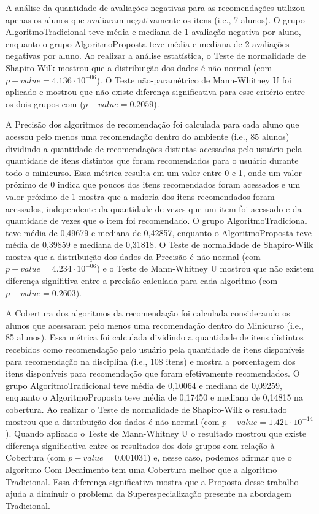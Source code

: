 A análise da quantidade de avaliações negativas para as recomendações utilizou apenas os alunos que avaliaram negativamente
os itens (i.e., 7 alunos). O grupo AlgoritmoTradicional teve média e mediana de 1 avaliação negativa
por aluno, enquanto o grupo AlgoritmoProposta teve média e mediana de 2 avaliações negativas por aluno.
Ao realizar a análise estatística, o Teste de normalidade de Shapiro-Wilk mostrou que a distribuição dos dados é não-normal
(com $p-value = 4.136 \cdot 10^{-06}$). O Teste não-paramétrico de Mann-Whitney U foi aplicado e mostrou que não existe
diferença significativa para esse critério entre os dois grupos com ($p-value = 0.2059$).

A Precisão dos algoritmos de recomendação foi calculada para cada aluno que acessou pelo menos uma recomendação dentro do
ambiente (i.e., 85 alunos) dividindo a quantidade de recomendações distintas acessadas pelo usuário pela quantidade de
itens distintos que foram recomendados para o usuário durante todo o minicurso. Essa métrica resulta em um valor entre
0 e 1, onde um valor próximo de 0 indica que poucos dos itens recomendados foram acessados e um valor próximo de 1
mostra que a maioria dos itens recomendados foram acessados, independente da quantidade de vezes que um item foi
acessado e da quantidade de vezes que o item foi recomendado. O grupo AlgoritmoTradicional teve média de
0,49679 e mediana de 0,42857, enquanto o AlgoritmoProposta teve média de 0,39859 e mediana de 0,31818.
O Teste de normalidade de Shapiro-Wilk mostra que a distribuição dos
dados da Precisão é não-normal (com $p-value = 4.234 \cdot 10^{-06}$) e o Teste de Mann-Whitney U mostrou que não existem diferença signifitiva entre a
precisão calculada para cada algoritmo (com $p-value = 0.2603$).

A Cobertura dos algoritmos da recomendação foi calculada considerando os alunos que acessaram pelo menos uma recomendação
dentro do Minicurso (i.e., 85 alunos). Essa métrica foi calculada dividindo a quantidade de itens distintos recebidos
como recomendação pelo usuário pela quantidade de itens disponíveis para recomendação na disciplina (i.e., 108 itens) e mostra
a porcentagem dos itens disponíveis para recomendação que foram efetivamente recomendados. O grupo AlgoritmoTradicional
teve média de 0,10064 e mediana de 0,09259, enquanto o AlgoritmoProposta teve média de 0,17450 e mediana de 0,14815 na cobertura.
Ao realizar o Teste de normalidade de Shapiro-Wilk o resultado mostrou que a distribuição dos dados é não-normal (com $p-value = 1.421 \cdot 10^{-14}$).
Quando aplicado o Teste de Mann-Whitney U o resultado mostrou que existe diferença significativa entre os resultados dos dois grupos com relação à Cobertura
(com $p-value = 0.001031$) e, nesse caso, podemos afirmar que o algoritmo Com Decaimento tem uma Cobertura melhor que a
algoritmo Tradicional. Essa diferença significativa mostra que a Proposta desse trabalho ajuda a diminuir o problema da Superespecialização presente na abordagem Tradicional.


